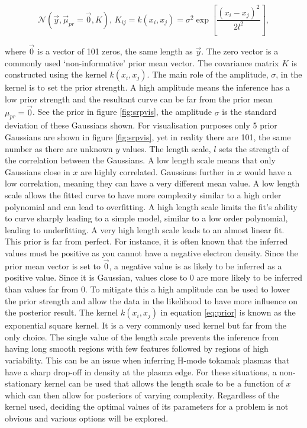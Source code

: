 \begin{equation}
  \mathcal{N}(\vec{y}, \vec \mu_{pr} = \vec{0}, K), \, K_{ij} = k(x_i, x_j) = \sigma^2 \exp\left[{\frac{(x_i - x_j)^2}{2l^2}}\right], 
  \label{eq:prior}
\end{equation}

\noindent where $\vec 0$ is a vector of 101 zeros, the same length as $\vec y$. The zero vector is a commonly used `non-informative' prior mean vector. The covariance matrix $K$ is constructed using the kernel $k(x_i,x_j)$. The main role of the amplitude, $\sigma$, in the kernel is to set the prior strength. A high amplitude means the inference has a low prior strength and the resultant curve can be far from the prior mean $\mu_{pr} = \vec 0$. See the prior in figure \ref{fig:srpvis}, the amplitude $\sigma$ is the standard deviation of these Gaussians shown. For visualisation purposes only 5 prior Gaussians are shown in figure \ref{fig:srpvis}, yet in reality there are 101, the same number as there are unknown $y$ values. The length scale, $l$ sets the strength of the correlation between the Gaussians. A low length scale means that only Gaussians close in $x$ are highly correlated. Gaussians further in $x$ would have a low correlation, meaning they can have a very different mean value. A low length scale allows the fitted curve to have more complexity similar to a high order polynomial and can lead to overfitting. A high length scale limits the fit's ability to curve sharply leading to a simple model, similar to a low order polynomial, leading to underfitting. A very high length scale leads to an almost linear fit. This prior is far from perfect. For instance, it is often known that the inferred values must be positive as you cannot have a negative electron density. Since the prior mean vector is set to $\vec{0}$, a negative value is as likely to be inferred as a positive value. Since it is Gaussian, values close to 0 are more likely to be inferred than values far from 0. To mitigate this a high amplitude can be used to lower the prior strength and allow the data in the likelihood to have more influence on the posterior result. The kernel $k(x_i,x_j)$ in equation \ref{eq:prior} is known as the exponential square kernel. It is a very commonly used kernel but far from the only choice. The single value of the length scale prevents the inference from having long smooth regions with few features followed by regions of high variability. This can be an issue when inferring H-mode tokamak plasmas that have a sharp drop-off in density at the plasma edge. For these situations, a non-stationary kernel can be used that allows the length scale to be a function of $x$ which can then allow for posteriors of varying complexity. Regardless of the kernel used, deciding the optimal values of its parameters for a problem is not obvious and various options will be explored. 

